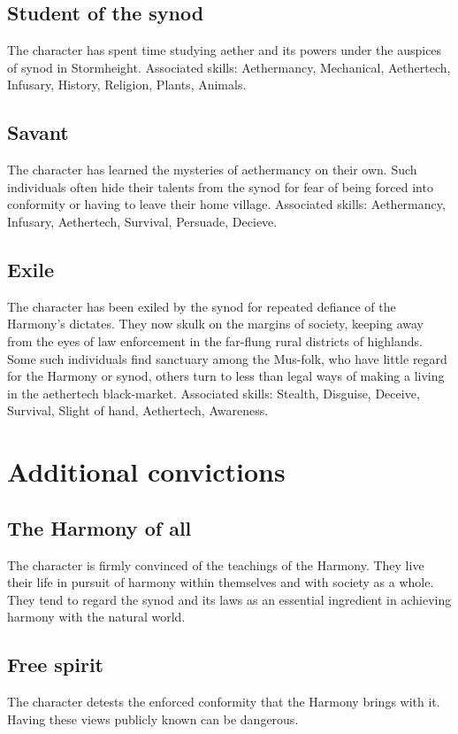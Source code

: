 \documentclass[a4paper,11pt,oneside]{book}
\begin{document}
\subsection{Student of the synod}
The character has spent time studying aether and its powers under the auspices of synod in Stormheight. Associated skills: Aethermancy, Mechanical, Aethertech, Infusary, History, Religion, Plants, Animals.

\subsection{Savant}
The character has learned the mysteries of aethermancy on their own. Such individuals often hide their talents from the synod for fear of being forced into conformity or having to leave their home village. Associated skills: Aethermancy, Infusary, Aethertech, Survival, Persuade, Decieve. 

\subsection{Exile}
The character has been exiled by the synod for repeated defiance of the Harmony's dictates. They now skulk on the margins of society, keeping away from the eyes of law enforcement in the far-flung rural districts of highlands. Some such individuals find sanctuary among the Mus-folk, who have little regard for the Harmony or synod, others turn to less than legal ways of making a living in the aethertech black-market. Associated skills: Stealth, Disguise, Deceive, Survival, Slight of hand, Aethertech, Awareness.   


\section{Additional convictions}

\subsection{The Harmony of all}
The character is firmly convinced of the teachings of the Harmony. They live their life in pursuit of harmony within themselves and with society as a whole. They tend to regard the synod and its laws as an essential ingredient in achieving harmony with the natural world.

\subsection{Free spirit}
The character detests the enforced conformity that the Harmony brings with it. Having these views publicly known can be dangerous. 
\end{document}
